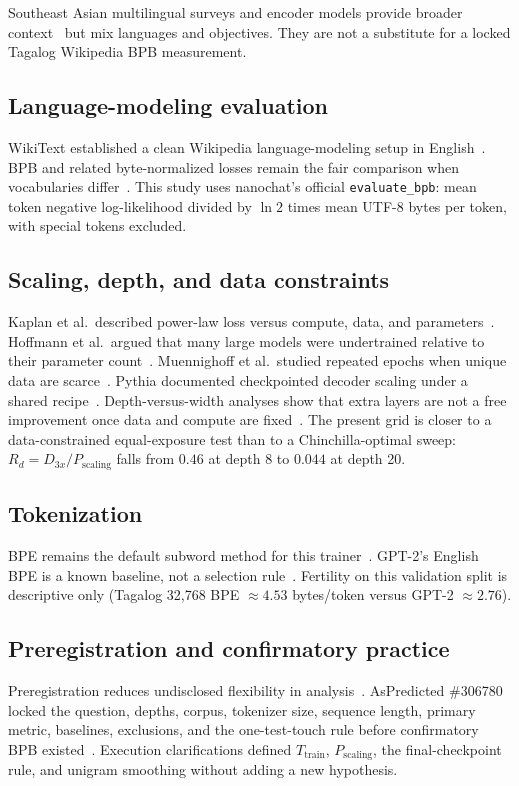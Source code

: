 \documentclass[11pt,a4paper]{article}
\begin{document}
Southeast Asian multilingual surveys and encoder models provide broader context~\cite{conneau2020xlmr,cahyawijaya2023nusacrowd} but mix languages and objectives. They are not a substitute for a locked Tagalog Wikipedia BPB measurement.

\subsection{Language-modeling evaluation}
WikiText established a clean Wikipedia language-modeling setup in English~\cite{merity2017pointer}. BPB and related byte-normalized losses remain the fair comparison when vocabularies differ~\cite{shannon1951prediction,graves2013generating,melis2018eval,brown2020gpt3,gao2020pile}. This study uses nanochat's official \texttt{evaluate\_bpb}: mean token negative log-likelihood divided by $\ln 2$ times mean UTF-8 bytes per token, with special tokens excluded.

\subsection{Scaling, depth, and data constraints}
Kaplan et al.\ described power-law loss versus compute, data, and parameters~\cite{kaplan2020scaling,henighan2020scaling}. Hoffmann et al.\ argued that many large models were undertrained relative to their parameter count~\cite{hoffmann2022chinchilla}. Muennighoff et al.\ studied repeated epochs when unique data are scarce~\cite{muennighoff2023dataconstrained}. Pythia documented checkpointed decoder scaling under a shared recipe~\cite{biderman2023pythia}. Depth-versus-width analyses show that extra layers are not a free improvement once data and compute are fixed~\cite{levine2020depth,press2020reordering,tay2022scale}. The present grid is closer to a data-constrained equal-exposure test than to a Chinchilla-optimal sweep: $R_d=D_{3x}/P_{\mathrm{scaling}}$ falls from $0.46$ at depth 8 to $0.044$ at depth 20.

\subsection{Tokenization}
BPE remains the default subword method for this trainer~\cite{sennrich2016bpe,kudo2018sentencepiece}. GPT-2's English BPE is a known baseline, not a selection rule~\cite{radford2019gpt2}. Fertility on this validation split is descriptive only (Tagalog 32{,}768 BPE $\approx 4.53$ bytes/token versus GPT-2 $\approx 2.76$).

\subsection{Preregistration and confirmatory practice}
Preregistration reduces undisclosed flexibility in analysis~\cite{simmons2011falsepositive,wagenmakers2012confirmatory,nosek2018prereg,munafo2017manifesto}. AsPredicted \#306780 locked the question, depths, corpus, tokenizer size, sequence length, primary metric, baselines, exclusions, and the one-test-touch rule before confirmatory BPB existed~\cite{aspredicted306780}. Execution clarifications defined $T_{\mathrm{train}}$, $P_{\mathrm{scaling}}$, the final-checkpoint rule, and unigram smoothing without adding a new hypothesis.
\end{document}
